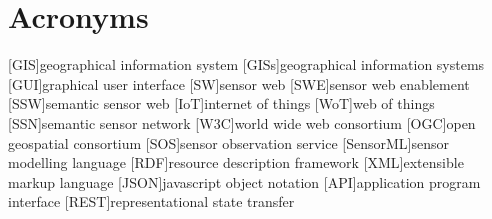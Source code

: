 
\chapter*{Acronyms}

\begin{acronym}[UML]
  [GIS]{geographical information system}
  [GISs]{geographical information systems}
  [GUI]{graphical user interface}
  [SW]{sensor web}
  [SWE]{sensor web enablement}
  [SSW]{semantic sensor web}
  [IoT]{internet of things}
  [WoT]{web of things}
  [SSN]{semantic sensor network}
  [W3C]{world wide web consortium}
  [OGC]{open geospatial consortium}
  [SOS]{sensor observation service}
  [SensorML]{sensor modelling language}
  [RDF]{resource description framework}
  [XML]{extensible markup language}
  [JSON]{javascript object notation}
  [API]{application program interface}
  [REST]{representational state transfer}
\end{acronym}